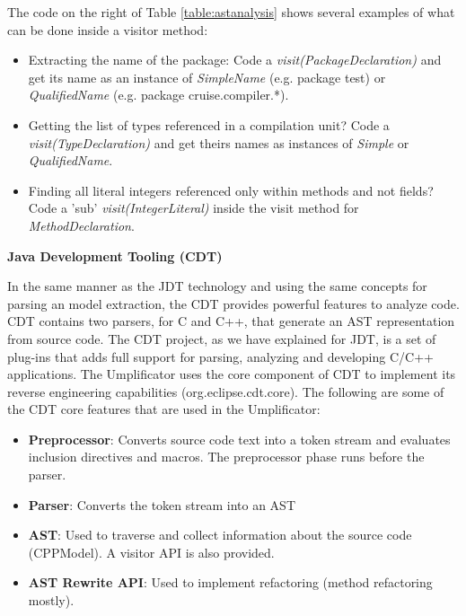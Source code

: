 The code on the right of Table \ref{table:astanalysis} shows several examples of what can be done inside a visitor method:

\begin{itemize}
\item Extracting the name of the package: Code a \textit{visit(PackageDeclaration)} and get its name as an instance of \textit{SimpleName} (e.g. package test)  or \textit{QualifiedName} (e.g. package cruise.compiler.*).
\item Getting the list of types referenced in a compilation unit? Code a \textit{visit(TypeDeclaration)} and get theirs names as instances of \textit{Simple} or \textit{QualifiedName}.
\item Finding all literal integers referenced only within methods and not fields? Code a 'sub' \textit{visit(IntegerLiteral)} inside the visit method for \textit{MethodDeclaration}.
\end{itemize}

\textbf{Java Development Tooling (CDT)}

In the same manner as the JDT technology and using the same concepts for parsing an model extraction, the CDT provides powerful features to analyze code. CDT contains two parsers, for C and C++, that generate an AST representation from source code. The CDT project, as we have explained for JDT, is a set of plug-ins that adds full support for parsing, analyzing and developing C/C++ applications. The Umplificator uses the core component of CDT to implement its reverse engineering capabilities (org.eclipse.cdt.core). The following are some of the CDT core features that are used in the Umplificator:


\begin{itemize}
\item \textbf{Preprocessor}: Converts source code text into a token stream and evaluates inclusion directives and macros. The preprocessor phase runs before the parser. 
\item \textbf{Parser}: Converts the token stream into an AST
\item \textbf{AST}: Used to traverse and collect information about the source code (CPPModel). A visitor API is also provided. 
\item \textbf{AST Rewrite API}: Used to implement refactoring (method refactoring mostly).
\end{itemize}

